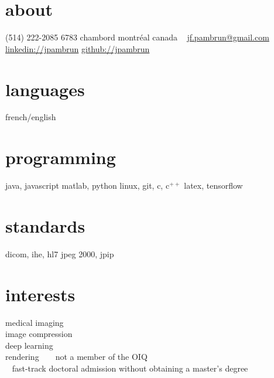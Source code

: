 \documentclass[print]{friggeri-cv}
\begin{document}

\newcommand{\eletr}{\href{http://www.etsmtl.ca/Programmes-Etudes/1er-cycle/Fiche-de-cours?Sigle=ELE747}{ele{\footnotesize747}}}
\newcommand{\eleenv}{\href{http://www.etsmtl.ca/Programmes-Etudes/1er-cycle/Fiche-de-cours?Sigle=ELE116}{ele{\footnotesize116}}}
\newcommand{\infmat}{\href{http://www.polymtl.ca/etudes/cours/details.php?sigle=INF1005a}{inf{\footnotesize1005}a}}
\newcommand{\gtssys}{\href{http://www.etsmtl.ca/Futurs-etudiants/Cycles-sup/Fiche-de-cours?Sigle=GTS840}{gts{\footnotesize840}}}

\begin{aside}
  \section{about}
  {\small(514) 222-2085}
  {\small6783} chambord
  montréal
  canada
  ~
  \href{mailto:jf.pambrun@gmail.com}{jf.pambrun@gmail.com}
  \href{https://ca.linkedin.com/in/jpambrun}{linkedin://jpambrun}
  \href{http://github.com/jpambrun}{github://jpambrun}
  \section{languages}
  french/english
  \section{programming}
  java, javascript
  matlab, python
  linux, git, c, c{\tiny$^{++}$}
  latex, tensorflow
  \section{standards}
  dicom, ihe, hl{\small7}
  jpeg {\small2000}, jpip
  \section{interests}
  medical imaging\\image compression\\deep learning\\rendering
  ~\vspace{2cm}
  {\footnotesize\textdagger~ not a member of the OIQ\\\textdaggerdbl~ fast-track doctoral admission without obtaining a master's degree}
\end{aside}
\end{document}

